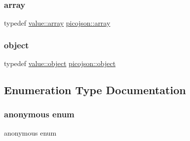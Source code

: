 \subsubsection{\texorpdfstring{array}{array}}
{\footnotesize\ttfamily typedef \hyperlink{classpicojson_1_1value_adeff4fdf7ee5675eeb7686bb89233c43}{value\+::array} \hyperlink{namespacepicojson_ac1e72166adfe3d96dc58cddc7ebd536a}{picojson\+::array}}

\hypertarget{namespacepicojson_a3e769a5e2dbffd9a9309e1dc2d67975b}{}\label{namespacepicojson_a3e769a5e2dbffd9a9309e1dc2d67975b} 
\subsubsection{\texorpdfstring{object}{object}}
{\footnotesize\ttfamily typedef \hyperlink{classpicojson_1_1value_a7d7da11d54d7b983a902d28367bda9c1}{value\+::object} \hyperlink{namespacepicojson_a3e769a5e2dbffd9a9309e1dc2d67975b}{picojson\+::object}}



\subsection{Enumeration Type Documentation}
\hypertarget{namespacepicojson_acbcfb4072b62a8a097a2aaf7a8f8cc02}{}\label{namespacepicojson_acbcfb4072b62a8a097a2aaf7a8f8cc02} 
\subsubsection{\texorpdfstring{anonymous enum}{anonymous enum}}
{\footnotesize\ttfamily anonymous enum}

